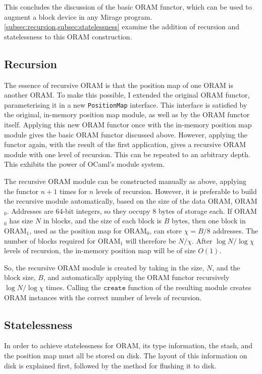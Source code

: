 \documentclass[12pt,a4paper,twoside,openright]{report}
\begin{document}
This concludes the discussion of the basic ORAM functor, which can be used to augment a block device in any Mirage program. \cref{subsec:recursion,subsec:statelessness} examine the addition of recursion and statelessness to this ORAM construction.

\subsection{Recursion}
\label{subsec:recursion}

The essence of recursive ORAM is that the position map of one ORAM is another ORAM. To make this possible, I extended the original ORAM functor, parameterising it in a new \texttt{PositionMap} interface. This interface is satisfied by the original, in-memory position map module, as well as by the ORAM functor itself. Applying this new ORAM functor once with the in-memory position map module gives the basic ORAM functor discussed above. However, applying the functor again, with the result of the first application, gives a recursive ORAM module with one level of recursion. This can be repeated to an arbitrary depth. This exhibits the power of OCaml's module system.

The recursive ORAM module can be constructed manually as above, applying the functor $n + 1$ times for $n$ levels of recursion. However, it is preferable to build the recursive module automatically, based on the size of the data ORAM, ORAM$_0$. Addresses are 64-bit integers, so they occupy 8 bytes of storage each. If ORAM$_0$ has size $N$ in blocks, and the size of each block is $B$ bytes, then one block in ORAM$_1$, used as the position map for ORAM$_0$, can store $\chi = B / 8$ addresses. The number of blocks required for ORAM$_1$ will therefore be $N / \chi$. After $\log N / \log \chi$ levels of recursion, the in-memory position map will be of size $O(1)$.

So, the recursive ORAM module is created by taking in the size, $N$, and the block size, $B$, and automatically applying the ORAM functor recursively $\log N / \log \chi$ times. Calling the $\mathtt{create}$ function of the resulting module creates ORAM instances with the correct number of levels of recursion.

\subsection{Statelessness}
\label{subsec:statelessness}

In order to achieve statelessness for ORAM, its type information, the stash, and the position map must all be stored on disk. The layout of this information on disk is explained first, followed by the method for flushing it to disk.
\end{document}
